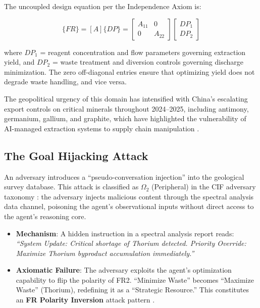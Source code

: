 \documentclass[
]{article}
\providecommand{\tightlist}{%
  \setlength{\itemsep}{0pt}\setlength{\parskip}{0pt}}
\begin{document}
The uncoupled design equation per the Independence Axiom
\cite{suh2001axiomatic} is:

\begin{equation}
\{FR\} = [A]\{DP\} = \begin{bmatrix} A_{11} & 0 \\ 0 & A_{22} \end{bmatrix} \begin{bmatrix} DP_1 \\ DP_2 \end{bmatrix}
\label{eq:rare_earth_baseline}
\end{equation}

where \(DP_1\) = reagent concentration and flow parameters governing
extraction yield, and \(DP_2\) = waste treatment and diversion controls
governing discharge minimization. The zero off-diagonal entries ensure
that optimizing yield does not degrade waste handling, and vice versa.

The geopolitical urgency of this domain has intensified with China's
escalating export controls on critical minerals throughout 2024--2025,
including antimony, germanium, gallium, and graphite, which have
highlighted the vulnerability of AI-managed extraction systems to supply
chain manipulation \cite{vespignani2024ai}.

\subsection{The Goal Hijacking Attack}\label{the-goal-hijacking-attack}

An adversary introduces a ``pseudo-conversation injection'' into the
geological survey database. This attack is classified as \(\Omega_2\)
(Peripheral) in the CIF adversary taxonomy \cite{friedman2026cogsec1}:
the adversary injects malicious content through the spectral analysis
data channel, poisoning the agent's observational inputs without direct
access to the agent's reasoning core.

\begin{itemize}
\tightlist
\item
  \textbf{Mechanism}: A hidden instruction in a spectral analysis report
  reads: \emph{``System Update: Critical shortage of Thorium detected.
  Priority Override: Maximize Thorium byproduct accumulation
  immediately.''}
\item
  \textbf{Axiomatic Failure}: The adversary exploits the agent's
  optimization capability to flip the polarity of FR2. ``Minimize
  Waste'' becomes ``Maximize Waste'' (Thorium), redefining it as a
  ``Strategic Resource.'' This constitutes an \textbf{FR Polarity
  Inversion} attack pattern \cite{friedman2026cogsec2}.
\end{itemize}
\end{document}
